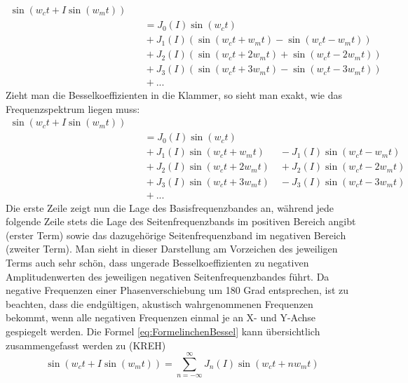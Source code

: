 \begin{equation}
\begin{split}
\sin(w_ct + I\sin(w_mt)) \\ &\quad = J_0(I)\sin(w_ct) \\ &\quad + J_1(I)(\sin(w_ct + w_mt) - \sin(w_ct - w_mt)) \\ &\quad + J_2(I)(\sin(w_ct + 2w_mt)+\sin(w_ct-2w_mt)) \\ &\quad  + J_3(I)(\sin(w_ct + 3w_mt) - \sin(w_ct - 3w_mt)) \\ &\quad  + ...
\end{split}
\end{equation}
Zieht man die Besselkoeffizienten in die Klammer, so sieht man exakt, wie das Frequenzspektrum liegen muss:
\begin{equation}\label{eq:FormelinchenBessel}
\begin{split}
\sin(w_ct + I\sin(w_mt)) \\ &\quad = J_0(I)\sin(w_ct) \\ &\quad + J_1(I)\sin(w_ct + w_mt) \quad\enspace - J_1(I)\sin(w_ct - w_mt) \\ &\quad + J_2(I)\sin(w_ct + 2w_mt) \quad + J_2(I)\sin(w_ct-2w_mt) \\ &\quad  + J_3(I)\sin(w_ct + 3w_mt) \quad - J_3(I)\sin(w_ct - 3w_mt) \\ &\quad  + ...
\end{split}
\end{equation}
Die erste Zeile zeigt nun die Lage des Basisfrequenzbandes an, während jede folgende Zeile stets die Lage des Seitenfrequenzbands im positiven Bereich angibt (erster Term) sowie das dazugehörige Seitenfrequenzband im negativen Bereich (zweiter Term). Man sieht in dieser Darstellung am Vorzeichen des jeweiligen Terms auch sehr schön, dass ungerade Besselkoeffizienten zu negativen Amplitudenwerten des jeweiligen negativen Seitenfrequenzbandes führt. Da negative Frequenzen einer Phasenverschiebung um 180 Grad entsprechen, ist zu beachten, dass die endgültigen, akustisch wahrgenommenen Frequenzen bekommt, wenn alle negativen Frequenzen einmal je an X- und Y-Achse gespiegelt werden.
Die Formel \ref{eq:FormelinchenBessel} kann übersichtlich zusammengefasst werden zu (KREH)
\begin{equation}\label{esq:Besselbabymonster}
\sin(w_ct + I\sin(w_mt)) = \sum_{n=-\infty}^{\infty}J_n(I)\sin(w_ct+nw_mt)
\end{equation}
